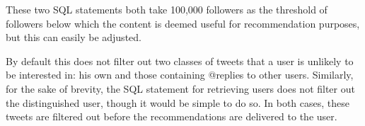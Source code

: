 \noindent
These two SQL statements both take 100,000 followers as the threshold of followers below which the content is deemed useful for recommendation purposes, but this can easily be adjusted.

By default this does not filter out two classes of tweets that a user is unlikely to be interested in: his own and those containing @replies to other users. Similarly, for the sake of brevity, the SQL statement for retrieving users does not filter out the distinguished user, though it would be simple to do so. In both cases, these tweets are filtered out before the recommendations are delivered to the user.




